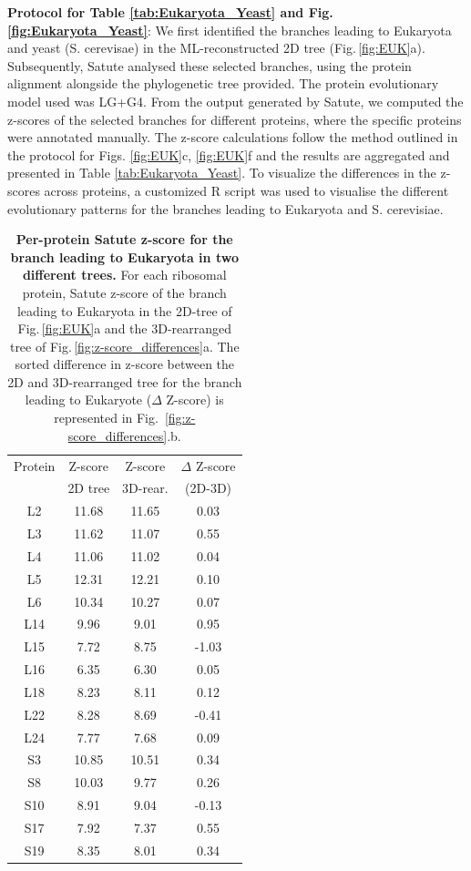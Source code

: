 \begin{appendices}
\noindent \textbf{Protocol for  Table \ref{tab:Eukaryota_Yeast}  and Fig.\,\ref{fig:Eukaryota_Yeast}}:
 We first identified the branches leading to Eukaryota and yeast (S. cerevisae) in the ML-reconstructed 2D tree (Fig.\,\ref{fig:EUK}a). Subsequently, Satute analysed these selected branches, using the protein alignment alongside the phylogenetic tree provided. The protein evolutionary model used was LG+G4. From the output generated by Satute, we computed the z-scores of the selected branches for different proteins, where the specific proteins were annotated manually. The z-score calculations follow the method outlined in the protocol for Figs. \ref{fig:EUK}c, \ref{fig:EUK}f  and the results are aggregated and presented in Table \ref{tab:Eukaryota_Yeast}. To visualize the differences in the z-scores across proteins, a customized R script was used to visualise the different evolutionary patterns for the branches leading to Eukaryota and S. cerevisiae.

 \medskip


\begin{table}[h!]
    \centering
    \begin{tabular}{|c|c|c|c|}
\hline
Protein& Z-score & Z-score& $\Delta$ Z-score\\
&2D tree & 3D-rear. & (2D-3D)\\
\hline
L2&11.68&11.65& 0.03\\
L3&11.62&11.07& 0.55\\
L4&11.06&11.02& 0.04\\
L5&12.31&12.21& 0.10\\
L6&10.34&10.27& 0.07\\
L14&9.96&9.01& 0.95\\
L15&7.72&8.75& -1.03\\
L16&6.35&6.30& 0.05\\
L18&8.23&8.11& 0.12\\
L22&8.28&8.69& -0.41\\
L24&7.77&7.68& 0.09\\
S3&10.85&10.51& 0.34\\
S8&10.03&9.77& 0.26\\
S10&8.91&9.04& -0.13\\
S17&7.92&7.37& 0.55\\
S19&8.35&8.01& 0.34\\
\hline
    \end{tabular}
    \vspace{0.25cm}
    \caption{\textbf{Per-protein Satute z-score for the branch leading to Eukaryota in two different trees.} For each ribosomal protein, Satute z-score of the branch leading to Eukaryota in the 2D-tree of Fig.\,\ref{fig:EUK}a and the 3D-rearranged tree of Fig.\,\ref{fig:z-score_differences}a. The sorted difference in z-score between the 2D and 3D-rearranged tree for the branch leading to Eukaryote ($\Delta$ Z-score) is represented in Fig.\, \ref{fig:z-score_differences}.b.}
    \label{tab:protein_2D_3D}
    \end{table}


\end{appendices}
